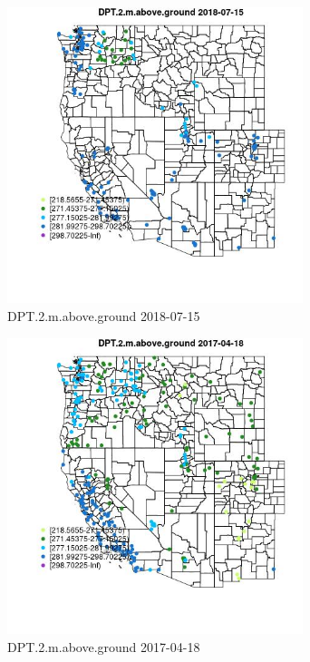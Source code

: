 \begin{figure} 
\centering  
\includegraphics[width=0.77\textwidth]{Code_Outputs/Report_ML_input_PM25_Step4_part_e_de_duplicated_aves_compiled_2019-05-20wNAs_MapObsDPT2maboveground2018-07-15.jpg} 
\caption{\label{fig:Report_ML_input_PM25_Step4_part_e_de_duplicated_aves_compiled_2019-05-20wNAsMapObsDPT2maboveground2018-07-15}DPT.2.m.above.ground 2018-07-15} 
\end{figure} 
 

\begin{figure} 
\centering  
\includegraphics[width=0.77\textwidth]{Code_Outputs/Report_ML_input_PM25_Step4_part_e_de_duplicated_aves_compiled_2019-05-20wNAs_MapObsDPT2maboveground2017-04-18.jpg} 
\caption{\label{fig:Report_ML_input_PM25_Step4_part_e_de_duplicated_aves_compiled_2019-05-20wNAsMapObsDPT2maboveground2017-04-18}DPT.2.m.above.ground 2017-04-18} 
\end{figure} 
 

